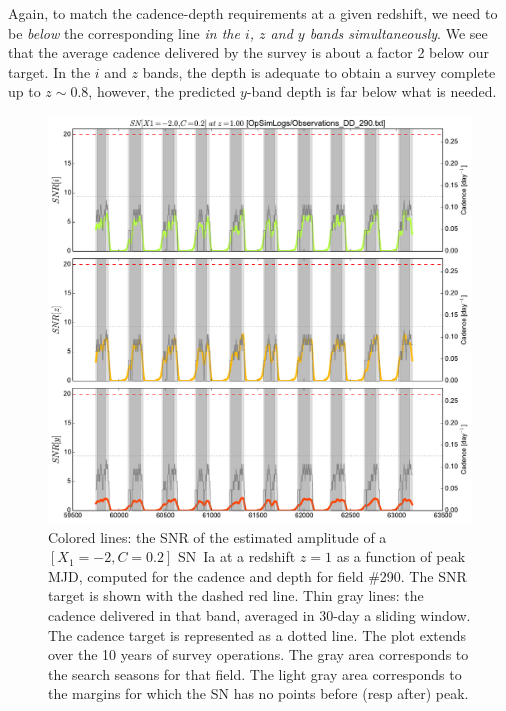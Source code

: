 \documentclass[\docopts]{\docclass}
\begin{document}
Again, to match the cadence-depth requirements at a given redshift, we need
to be {\em below} the corresponding line {\em in the $i$, $z$ and $y$
  bands simultaneously}. We see that the average cadence delivered by
the survey is about a factor 2 below our target. In the $i$ and $z$
bands, the depth is adequate to obtain a survey complete up to $z \sim
0.8$, however, the predicted $y$-band depth is far below what is
needed.


\begin{figure}[t]
  \begin{center}
    \includegraphics[width=\linewidth]{metric_DD_290.pdf}
    \caption{Colored lines: the SNR of the estimated amplitude of a
      $[X_1=-2, C=0.2]$ SN~Ia at a redshift $z = 1$ as a function of
      peak MJD, computed for the  cadence and depth
      for field \#290. The SNR target is shown with the dashed red
      line.  Thin gray lines: the cadence delivered in that band,
      averaged in 30-day a sliding window.  The cadence target is
      represented as a dotted line. The plot extends over the 10 years
      of survey operations. The gray area corresponds to the search
      seasons for that field. The light gray area corresponds to the
      margins for which the SN has no points before (resp after)
      peak.}
    \label{fig:snr_metric}
  \end{center}
\end{figure}
\end{document}
